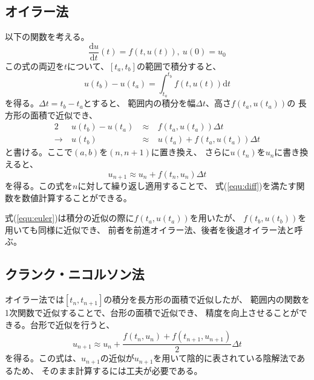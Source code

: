 \documentclass[a4j, titlepage]{jsarticle}
\numberwithin{equation}{section}
\begin{document}
    \subsection{オイラー法}
        以下の関数を考える。
        \begin{equation}
            \frac{\mathrm{d}u}{\mathrm{d}t}(t) = f(t, u(t)), \ u(0) = u_0 \label{equ:diff}
        \end{equation}
        この式の両辺を$t$について、$[t_a, t_b]$の範囲で積分すると、
        \begin{equation*}
            u(t_b) - u(t_a) = \int^{t_b}_{t_a}f(t, u(t))\mathrm{d}t
        \end{equation*}
        を得る。$\Delta t = t_b - t_a$とすると、
        範囲内の積分を幅$\Delta t$、高さ$f(t_a, u(t_a))$の
        長方形の面積で近似でき、
        \begin{alignat*}{2}
            & u(t_b) - u(t_a) & \ \approx \ & f(t_a, u(t_a))\Delta t \\
            \rightarrow \ & u(t_b) & \ \approx \ & u(t_a) + f(t_a, u(t_a))\Delta t
        \end{alignat*}
        と書ける。ここで$(a, b)$を$(n, n + 1)$に置き換え、
        さらに$u(t_n)$を$u_n$に書き換えると、
        \begin{equation}
            u_{n + 1} \approx u_n + f(t_n, u_n)\Delta t \label{equ:euler}
        \end{equation}
        を得る。この式を$n$に対して繰り返し適用することで、
        式(\ref{equ:diff})を満たす関数を数値計算することができる。

        式(\ref{equ:euler})は積分の近似の際に$f(t_a, u(t_a))$を用いたが、
        $f(t_b, u(t_b))$を用いても同様に近似でき、
        前者を前進オイラー法、後者を後退オイラー法と呼ぶ。

    \subsection{クランク・ニコルソン法} \label{sec:crank}
        オイラー法では$[t_n, t_{n+1}]$の積分を長方形の面積で近似したが、
        範囲内の関数を1次関数で近似することで、台形の面積で近似でき、
        精度を向上させることができる。台形で近似を行うと、
        \begin{equation}
            u_{n + 1} \approx u_n + \frac{f(t_n, u_n) + f(t_{n+1}, u_{n+1})}{2}\Delta t \label{equ:crank}
        \end{equation}
        を得る。この式は、$u_{n+1}$の近似が$u_{n+1}$を用いて陰的に表されている陰解法であるため、
        そのまま計算するには工夫が必要である。
\end{document}

